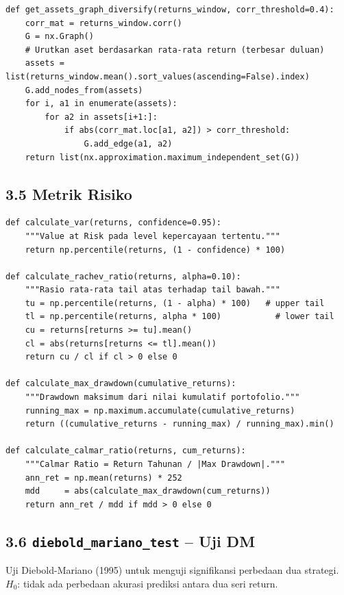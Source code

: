 \documentclass[12pt,a4paper]{article}
\begin{document}
\begin{lstlisting}[caption={\texttt{get\_assets\_graph\_diversify}}]
def get_assets_graph_diversify(returns_window, corr_threshold=0.4):
    corr_mat = returns_window.corr()
    G = nx.Graph()
    # Urutkan aset berdasarkan rata-rata return (terbesar duluan)
    assets = list(returns_window.mean().sort_values(ascending=False).index)
    G.add_nodes_from(assets)
    for i, a1 in enumerate(assets):
        for a2 in assets[i+1:]:
            if abs(corr_mat.loc[a1, a2]) > corr_threshold:
                G.add_edge(a1, a2)
    return list(nx.approximation.maximum_independent_set(G))
\end{lstlisting}

\subsection{3.5 Metrik Risiko}

\begin{lstlisting}[caption={Value at Risk, Rachev Ratio, Max Drawdown, Calmar Ratio}]
def calculate_var(returns, confidence=0.95):
    """Value at Risk pada level kepercayaan tertentu."""
    return np.percentile(returns, (1 - confidence) * 100)

def calculate_rachev_ratio(returns, alpha=0.10):
    """Rasio rata-rata tail atas terhadap tail bawah."""
    tu = np.percentile(returns, (1 - alpha) * 100)   # upper tail
    tl = np.percentile(returns, alpha * 100)           # lower tail
    cu = returns[returns >= tu].mean()
    cl = abs(returns[returns <= tl].mean())
    return cu / cl if cl > 0 else 0

def calculate_max_drawdown(cumulative_returns):
    """Drawdown maksimum dari nilai kumulatif portofolio."""
    running_max = np.maximum.accumulate(cumulative_returns)
    return ((cumulative_returns - running_max) / running_max).min()

def calculate_calmar_ratio(returns, cum_returns):
    """Calmar Ratio = Return Tahunan / |Max Drawdown|."""
    ann_ret = np.mean(returns) * 252
    mdd     = abs(calculate_max_drawdown(cum_returns))
    return ann_ret / mdd if mdd > 0 else 0
\end{lstlisting}

\subsection{3.6 \texttt{diebold\_mariano\_test} -- Uji DM}
Uji Diebold-Mariano (1995) untuk menguji signifikansi perbedaan dua strategi.
$H_0$: tidak ada perbedaan akurasi prediksi antara dua seri return.
\end{document}
